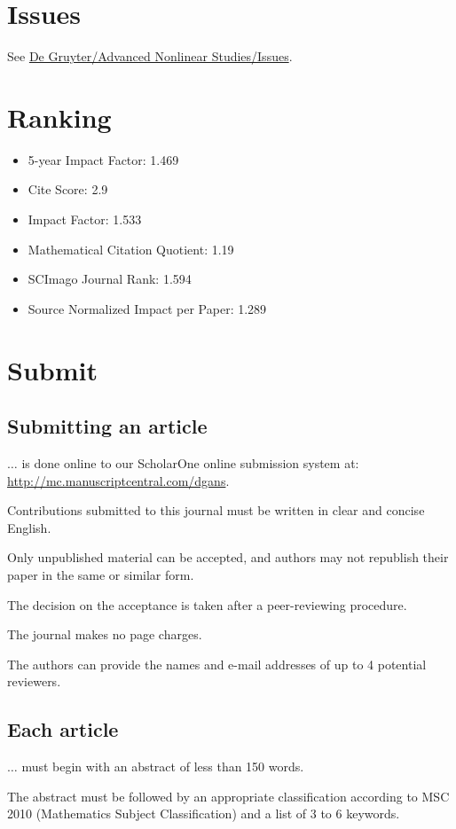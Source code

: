 \documentclass{book}
\numberwithin{equation}{section}
\begin{document}
\section{Issues}
See \href{https://www.degruyter.com/journal/key/ANS/html}{De Gruyter/Advanced Nonlinear Studies/Issues}.

\section{Ranking}
\begin{itemize}
    \item 5-year Impact Factor: 1.469
    \item Cite Score: 2.9
    \item Impact Factor: 1.533
    \item Mathematical Citation Quotient: 1.19
    \item SCImago Journal Rank: 1.594
    \item Source Normalized Impact per Paper: 1.289
\end{itemize}

\section{Submit}

\subsection{Submitting an article}
$\ldots$ is done online to our ScholarOne online submission system at: \url{http://mc.manuscriptcentral.com/dgans}.

%
Contributions submitted to this journal must be written in clear and concise English.

Only unpublished material can be accepted, and authors may not republish their paper in the same or similar form.

The decision on the acceptance is taken after a peer-reviewing procedure.

The journal makes no page charges.

The authors can provide the names and e-mail addresses of up to 4 potential reviewers.

\subsection{Each article}
$\ldots$ must begin with an abstract of less than 150 words.

The abstract must be followed by an appropriate classification according to MSC 2010 (Mathematics Subject Classification) and a list of 3 to 6 keywords.
\end{document}
